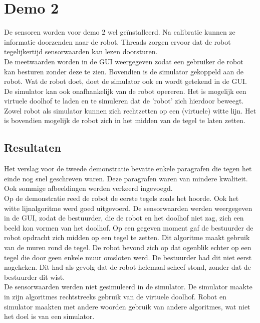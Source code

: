 \documentclass[tt3]{penoverslag}
\begin{document}
\section{Demo 2} %
\label{Asec:demo2}
De sensoren worden voor demo 2 wel ge\"installeerd. Na calibratie kunnen ze informatie doorzenden naar de robot. Threads zorgen ervoor dat de robot tegelijkertijd sensorwaarden kan lezen doorsturen.\\

De meetwaarden worden in de GUI weergegeven zodat een gebruiker de robot kan besturen zonder deze te zien. Bovendien is de simulator gekoppeld aan de robot. Wat de robot doet, doet de simulator ook en wordt getekend in de GUI. De simulator kan ook onafhankelijk van de robot opereren. Het is mogelijk een virtuele doolhof te laden en te simuleren dat de 'robot' zich hierdoor beweegt. Zowel robot als simulator kunnen zich rechtzetten op een (virtuele) witte lijn. Het is bovendien mogelijk de robot zich in het midden van de tegel te laten zetten.


\subsection{Resultaten} %
\label{Assec:result2}
Het verslag voor de tweede demonstratie bevatte enkele paragrafen die tegen het einde nog snel geschreven waren. Deze paragrafen waren van mindere kwaliteit. Ook sommige afbeeldingen werden verkeerd ingevoegd.\\

Op de demonstratie reed de robot de eerste tegels zoals het hoorde. Ook het witte lijnalgoritme werd goed uitgevoerd. De sensorwaarden werden weergegeven in de GUI, zodat de bestuurder, die de robot en het doolhof niet zag, zich een beeld kon vormen van het doolhof. Op een gegeven moment gaf de bestuurder de robot opdracht zich midden op een tegel te zetten. Dit algoritme maakt gebruik van de muren rond de tegel. De robot bevond zich op dat ogenblik echter op een tegel die door geen enkele muur omsloten werd. De bestuurder had dit niet eerst nagekeken. Dit had als gevolg dat de robot helemaal scheef stond, zonder dat de bestuurder dit wist.\\

De sensorwaarden werden niet gesimuleerd in de simulator. De simulator maakte in zijn algoritmes rechtstreeks gebruik van de virtuele doolhof. Robot en simulator maakten met andere woorden gebruik van andere algoritmes, wat niet het doel is van een simulator.\\
\end{document}
